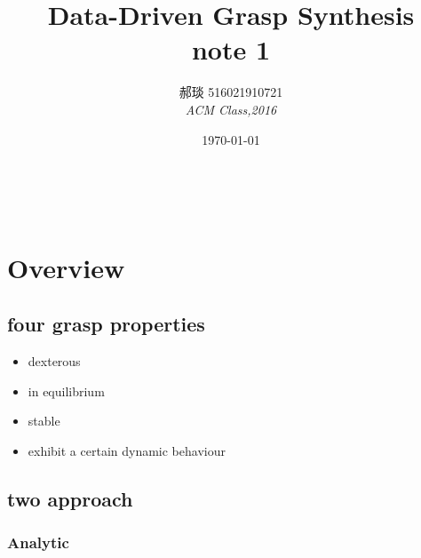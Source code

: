 \documentclass[a4paper, 11pt]{article} %
\title{\textbf{Data-Driven Grasp Synthesis}\\ %
note 1} %
\author{\textsc{郝琰 516021910721} %
\\{\textit{ACM Class,2016}}} %
\date{\today} %
\makeatletter
\renewcommand{\maketitle}{ %

\begin{flushright} %
{\LARGE\@title} %

\vspace{50pt} %

{\large\@author} %
\\\@date %

\vspace{10pt} %
\end{flushright}
}
\makeatother
\begin{document}
\maketitle %

\section{Overview}
\subsection{four grasp properties}
\begin{itemize}
	\item dexterous
	\item in equilibrium
	\item stable
	\item exhibit a certain dynamic behaviour
\end{itemize}
\subsection{two approach}
\subsubsection{Analytic}

\subsubsection{}
\end{document}
